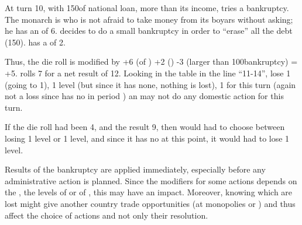 \begin{exemple}
  At turn 10, with 150\ducats of national loan, more than its income, \RUS
  tries a bankruptcy. The monarch is  who is not afraid to
  take money from its boyars without asking; he has an \ADM of 6. \RUS decides
  to do a small bankruptcy in order to ``erase'' all the debt
  (150\ducats). \RUS has a \STAB of 2.

  Thus, the die roll is modified by +6 (\ADM of ) +2 (\STAB)
  -3 (larger than 100\ducats bankruptcy) = +5. \RUS rolls 7 for a net result
  of 12. Looking in the table in the line ``11-14'', \RUS lose 1 \STAB (going
  to 1), 1 \TradeFLEET level (but since it has none, nothing is lost), 1\TFI
  for this turn (again not a loss since \RUS has no \TFI in period
  ) an may not do any domestic action for this turn.

  If the die roll had been 4, and the result 9, then \RUS would had to choose
  between losing 1 \TradeFLEET level or 1 \MNU level, and since it has no
  \TradeFLEET at this point, it would had to lose 1 \MNU level.
\end{exemple}


\aparag Results of the bankruptcy are applied immediately, especially before
any administrative action is planned.
\bparag Since the modifiers for some actions depends on the \STAB, the levels
of \TradeFLEET or of \MNU, this may have an impact.
\bparag Moreover, knowing which \TradeFLEET are lost might give another
country trade opportunities (at monopolies or ) and thus
affect the choice of actions and not only their resolution.

